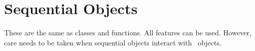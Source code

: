 \section{Sequential Objects}

These are the same as \CC{} classes and functions.  All \CC{} features can
be used.  However, care needs to be taken when sequential objects
interact with \charmpp\ objects.
